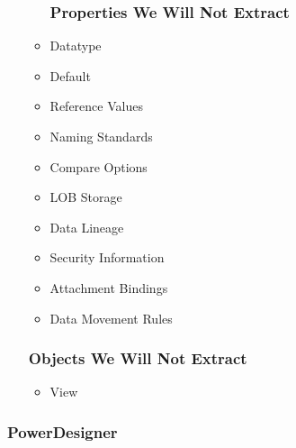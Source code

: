\begin{itemize}
\begin{itemize}
		\subsubsection{Properties We Will Not Extract}
		\item Datatype
		\item Default
		\item Reference Values
		\item Naming Standards
		\item Compare Options
		\item LOB Storage
		\item Data Lineage
		\item Security Information
		\item Attachment Bindings
		\item Data Movement Rules
	\end{itemize}
	\subsubsection{Objects We Will Not Extract}
		\begin{itemize}
			\item View
		\end{itemize}
\end{itemize}

\subsubsection{PowerDesigner}

